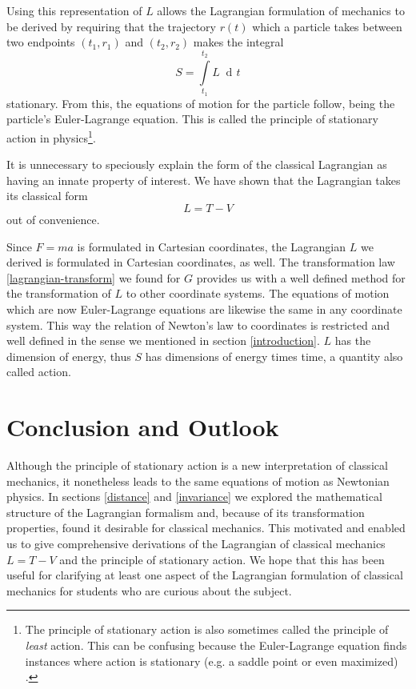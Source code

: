 \documentclass[prb,preprint]{revtex4-1}
\DeclareMathOperator{\dd}{d\!}
\begin{document}
Using this representation of $L$ allows the Lagrangian formulation of mechanics to be derived by requiring that the trajectory $r(t)$ which a particle takes between two endpoints $(t_1,r_1)$ and $(t_2,r_2)$ makes the integral
\begin{equation}\label{eqref:action}
S=\int\limits_{t_1}^{t_2} L \; \dd t
\end{equation}
stationary. From this, the equations of motion for the particle follow, being the particle's Euler-Lagrange equation. This is called the principle of stationary action in physics\footnote{The principle of stationary action is also sometimes called the principle of \emph{least} action. This can be confusing because the Euler-Lagrange equation finds instances where action is stationary (e.g. a saddle point or even maximized)  \cite{gray2007action}.}.

It is unnecessary to speciously explain the form of the classical Lagrangian as having an innate property of interest. We have shown that the Lagrangian takes its classical form
\begin{equation}
  L = T-V
\end{equation}
out of convenience.

Since $F=ma$ is formulated in Cartesian coordinates, the Lagrangian $L$ we derived is formulated in Cartesian coordinates, as well. The transformation law \eqref{lagrangian-transform} we found for $G$ provides us with a well defined method for the transformation of $L$ to other coordinate systems. The equations of motion which are now Euler-Lagrange equations are likewise the same in any coordinate system.  This way the relation of Newton's law to coordinates is restricted and well defined in the sense we mentioned in section \ref{introduction}. $L$ has the dimension of energy, thus $S$ has dimensions of energy times time, a quantity also called action.

\section{Conclusion and Outlook}

Although the principle of stationary action is a new interpretation of classical mechanics, it nonetheless leads to the same equations of motion as Newtonian physics. In sections \ref{distance} and \ref{invariance} we explored the mathematical structure of the Lagrangian formalism and, because of its transformation properties, found it desirable for classical mechanics. This motivated and enabled us to give comprehensive derivations of the Lagrangian of classical mechanics $L=T-V$ and the principle of stationary action. We hope that this has been useful for clarifying at least one aspect of the Lagrangian formulation of classical mechanics for students who are curious about the subject.
\end{document}
